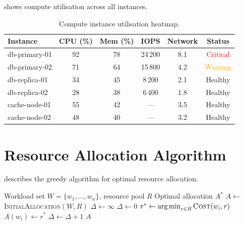\documentclass[
    language=english,
    doctype=technical-report,
    institution=none,
    titlestyle=book,
    oneside,
    loadGlossaries,
]{../../omnilatex}
\begin{document}
 shows compute utilisation across all instances.

\begin{table}[htbp]
    \centering
    \caption{Compute instance utilisation heatmap.\footnotemark}
    \label{tab:compute-overview}
    \begin{tabular}{@{}lccccc@{}}
        \toprule
        \textbf{Instance} & \textbf{CPU (\%)} & \textbf{Mem (\%)}
            & \textbf{IOPS} & \textbf{Network} & \textbf{Status} \\
        \midrule
        db-primary-01
            & \cellcolor{red!30}92 & \cellcolor{orange!30}78
            & \cellcolor{red!30}24\,200 & \cellcolor{yellow!30}8.1
            & \textcolor{red}{Critical} \\
        db-primary-02
            & \cellcolor{orange!30}71 & \cellcolor{yellow!30}64
            & \cellcolor{orange!30}15\,800 & \cellcolor{green!20}4.2
            & \textcolor{orange}{Warning} \\
        db-replica-01
            & \cellcolor{green!20}34 & \cellcolor{green!20}45
            & \cellcolor{green!20}8\,200 & \cellcolor{green!20}2.1
            & Healthy \\
        db-replica-02
            & \cellcolor{green!20}28 & \cellcolor{green!20}38
            & \cellcolor{green!20}6\,400 & \cellcolor{green!20}1.8
            & Healthy \\
        cache-node-01
            & \cellcolor{yellow!30}55 & \cellcolor{green!20}42
            & --- & \cellcolor{green!20}3.5 & Healthy \\
        cache-node-02
            & \cellcolor{green!20}48 & \cellcolor{green!20}40
            & --- & \cellcolor{green!20}3.2 & Healthy \\
        \bottomrule
    \end{tabular}
\end{table}
\addtocounter{footnote}{-1}

\section{Resource Allocation Algorithm}

 describes the greedy algorithm for optimal resource
allocation.

\begin{algorithm}[htbp]
\caption{Greedy resource allocation optimiser.}
\label{alg:optimise}
\begin{algorithmic}[1]
\REQUIRE Workload set $W = \{w_1, \ldots, w_n\}$, resource pool $R$
\ENSURE  Optimal allocation $A^*$
\STATE $A \gets$ \textsc{InitialAllocation}$(W, R)$
\STATE $\Delta \gets \infty$
\WHILE{$\Delta > \epsilon$}
    \STATE $\Delta \gets 0$
        \STATE $r^* \gets \operatorname*{arg\,min}_{r \in R} \textsc{Cost}(w_i, r)$
            \STATE $A(w_i) \gets r^*$
            \STATE $\Delta \gets \Delta + 1$
        \ENDIF
    \ENDFOR
\ENDWHILE
\RETURN $A$
\end{algorithmic}
\end{algorithm}
\end{document}
